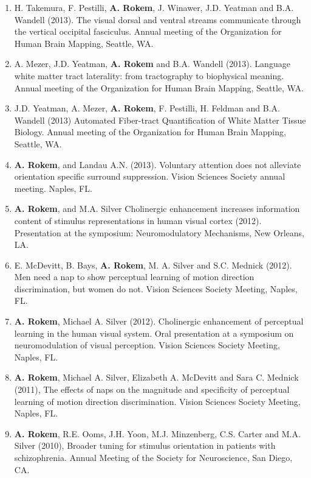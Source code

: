 \documentclass[11pt,fullpage]{article}
\begin{document}
\begin{enumerate}
\item H. Takemura, F. Pestilli, {\bf A. Rokem}, J. Winawer, J.D. Yeatman and B.A. Wandell (2013). The visual dorsal and ventral streams communicate through the vertical occipital fasciculus. Annual meeting of the Organization for Human Brain Mapping, Seattle, WA.

\item A. Mezer, J.D. Yeatman, {\bf A. Rokem} and B.A. Wandell (2013). Language white matter tract laterality: from tractography to biophysical meaning. Annual meeting of the Organization for Human Brain Mapping, Seattle, WA.

\item J.D. Yeatman, A. Mezer, {\bf A. Rokem}, F. Pestilli, H. Feldman and B.A. Wandell (2013) Automated Fiber-tract Quantification of White Matter Tissue Biology. Annual meeting of the Organization for Human Brain Mapping, Seattle, WA.

\item {\bf A. Rokem}, and Landau A.N. (2013). Voluntary attention does not alleviate orientation specific surround suppression. Vision Sciences Society annual meeting. Naples, FL.

\item {\bf A. Rokem}, and M.A. Silver Cholinergic enhancement increases information content of stimulus representations in human visual cortex (2012). Presentation at the symposium: Neuromodulatory Mechanisms, New Orleans, LA.

\item E. McDevitt, B. Bays, {\bf A. Rokem}, M. A. Silver and S.C. Mednick (2012). Men need a nap to show perceptual learning of motion direction discrimination, but women do not. Vision Sciences Society Meeting, Naples, FL.

\item {\bf A. Rokem}, Michael A. Silver (2012). Cholinergic enhancement of perceptual learning in the human visual system. Oral presentation at a symposium on neuromodulation of visual perception. Vision Sciences Society Meeting, Naples, FL.

\item {\bf A. Rokem}, Michael A. Silver, Elizabeth A. McDevitt and Sara C. Mednick (2011), The effects of naps on the magnitude and specificity of perceptual learning of motion direction discrimination. Vision Sciences Society Meeting, Naples, FL.

\item {\bf A. Rokem}, R.E. Ooms, J.H. Yoon, M.J. Minzenberg, C.S. Carter and M.A. Silver (2010), Broader tuning for stimulus orientation in patients with schizophrenia. Annual Meeting of the Society for Neuroscience, San Diego, CA.


\end{enumerate}
\end{document}
